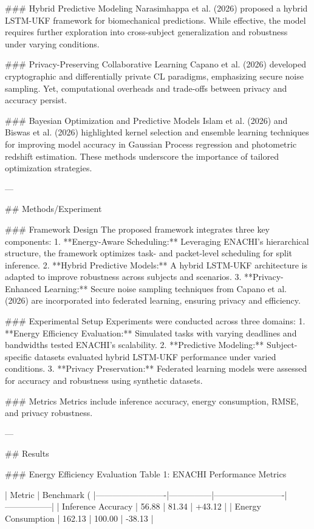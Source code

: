 ### Hybrid Predictive Modeling
Narasimhappa et al. (2026) proposed a hybrid LSTM-UKF framework for biomechanical predictions. While effective, the model requires further exploration into cross-subject generalization and robustness under varying conditions.

### Privacy-Preserving Collaborative Learning
Capano et al. (2026) developed cryptographic and differentially private CL paradigms, emphasizing secure noise sampling. Yet, computational overheads and trade-offs between privacy and accuracy persist.

### Bayesian Optimization and Predictive Models
Islam et al. (2026) and Biswas et al. (2026) highlighted kernel selection and ensemble learning techniques for improving model accuracy in Gaussian Process regression and photometric redshift estimation. These methods underscore the importance of tailored optimization strategies.

---

## Methods/Experiment

### Framework Design
The proposed framework integrates three key components:
1. **Energy-Aware Scheduling:** Leveraging ENACHI's hierarchical structure, the framework optimizes task- and packet-level scheduling for split inference.
2. **Hybrid Predictive Models:** A hybrid LSTM-UKF architecture is adapted to improve robustness across subjects and scenarios.
3. **Privacy-Enhanced Learning:** Secure noise sampling techniques from Capano et al. (2026) are incorporated into federated learning, ensuring privacy and efficiency.

### Experimental Setup
Experiments were conducted across three domains:
1. **Energy Efficiency Evaluation:** Simulated tasks with varying deadlines and bandwidths tested ENACHI's scalability.
2. **Predictive Modeling:** Subject-specific datasets evaluated hybrid LSTM-UKF performance under varied conditions.
3. **Privacy Preservation:** Federated learning models were assessed for accuracy and robustness using synthetic datasets.

### Metrics
Metrics include inference accuracy, energy consumption, RMSE, and privacy robustness.

---

## Results

### Energy Efficiency Evaluation
Table 1: ENACHI Performance Metrics

| Metric                  | Benchmark (%
|-------------------------|---------------|-------------------------|-----------------|
| Inference Accuracy      | 56.88         | 81.34                  | +43.12          |
| Energy Consumption      | 162.13        | 100.00                 | -38.13          |

